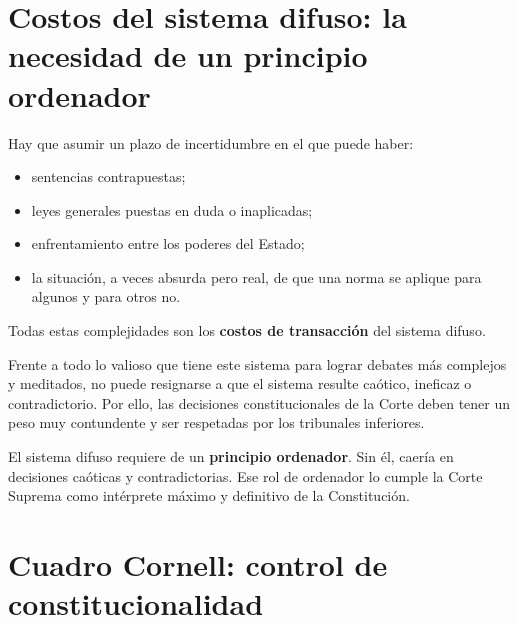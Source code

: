 \documentclass[12pt,oneside]{book}
\begin{document}
\section{Costos del sistema difuso: la necesidad de un principio ordenador}

Hay que asumir un plazo de incertidumbre en el que puede haber:

\begin{itemize}
    \item sentencias contrapuestas;
    \item leyes generales puestas en duda o inaplicadas;
    \item enfrentamiento entre los poderes del Estado;
    \item la situación, a veces absurda pero real, de que una norma se aplique para algunos y para otros no.
\end{itemize}

Todas estas complejidades son los \textbf{costos de transacción} del sistema difuso.

Frente a todo lo valioso que tiene este sistema para lograr debates más complejos y meditados, no puede resignarse a que el sistema resulte caótico, ineficaz o contradictorio. Por ello, las decisiones constitucionales de la Corte deben tener un peso muy contundente y ser respetadas por los tribunales inferiores.

\begin{important}
El sistema difuso requiere de un \textbf{principio ordenador}. Sin él, caería en decisiones caóticas y contradictorias. Ese rol de ordenador lo cumple la Corte Suprema como intérprete máximo y definitivo de la Constitución.
\end{important}

\section{Cuadro Cornell: control de constitucionalidad}
\end{document}
